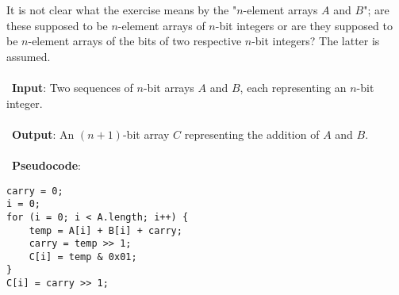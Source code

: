 It is not clear what the exercise means by the "$n$-element arrays $A$ and $B$"; are these supposed to be $n$-element arrays of $n$-bit integers or are they supposed to be $n$-element arrays of the bits of two respective $n$-bit integers? The latter is assumed.
\\ \\
\noindent~\textbf{Input}: Two sequences of $n$-bit arrays $A$ and $B$, each representing an $n$-bit integer.
\\ \\
\noindent~\textbf{Output}: An $(n + 1)$-bit array $C$ representing the addition of $A$ and $B$.
\\ \\
\noindent~\textbf{Pseudocode}:
\begin{verbatim}
carry = 0;
i = 0;
for (i = 0; i < A.length; i++) {
    temp = A[i] + B[i] + carry;
    carry = temp >> 1;
    C[i] = temp & 0x01;
}
C[i] = carry >> 1;
\end{verbatim}

